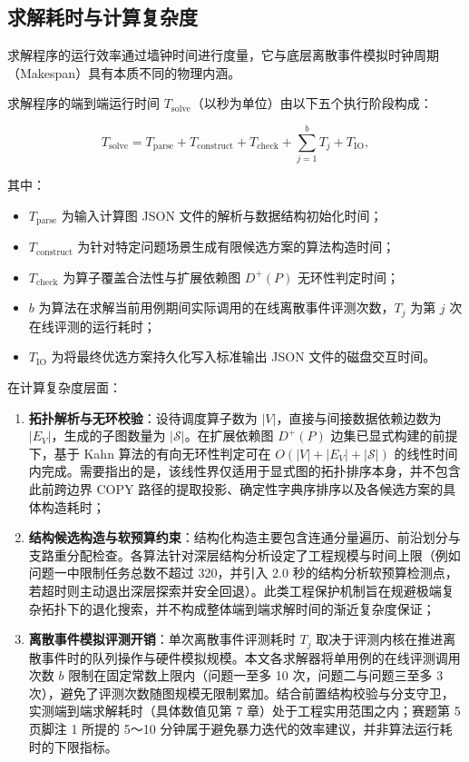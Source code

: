 \documentclass[anonymous,withtoc]{gmcm2026}
\providecommand{\tightlist}{\setlength{\itemsep}{0pt}\setlength{\parskip}{0pt}}
\begin{document}
\subsection{求解耗时与计算复杂度}

求解程序的运行效率通过墙钟时间进行度量，它与底层离散事件模拟时钟周期（Makespan）具有本质不同的物理内涵。

求解程序的端到端运行时间 \(T_{\mathrm{solve}}\)（以秒为单位）由以下五个执行阶段构成：

\begin{equation}
T_{\mathrm{solve}} = T_{\mathrm{parse}} + T_{\mathrm{construct}} + T_{\mathrm{check}} + \sum_{j=1}^{b} T_j + T_{\mathrm{IO}},
\end{equation}

其中：

\begin{itemize}
\tightlist
\item
  \(T_{\mathrm{parse}}\) 为输入计算图 JSON 文件的解析与数据结构初始化时间；
\item
  \(T_{\mathrm{construct}}\) 为针对特定问题场景生成有限候选方案的算法构造时间；
\item
  \(T_{\mathrm{check}}\) 为算子覆盖合法性与扩展依赖图 \(D^+(P)\) 无环性判定时间；
\item
  \(b\) 为算法在求解当前用例期间实际调用的在线离散事件评测次数，\(T_j\) 为第 \(j\) 次在线评测的运行耗时；
\item
  \(T_{\mathrm{IO}}\) 为将最终优选方案持久化写入标准输出 JSON 文件的磁盘交互时间。
\end{itemize}

在计算复杂度层面：

\begin{enumerate}
\def\labelenumi{\arabic{enumi}.}
\tightlist
\item
  \textbf{拓扑解析与无环校验}：设待调度算子数为 \(|V|\)，直接与间接数据依赖边数为 \(|E_V|\)，生成的子图数量为 \(|\mathcal{S}|\)。在扩展依赖图 \(D^+(P)\) 边集已显式构建的前提下，基于 Kahn 算法\cite{ref19}的有向无环性判定可在 \(O(|V| + |E_V| + |\mathcal{S}|)\) 的线性时间内完成。需要指出的是，该线性界仅适用于显式图的拓扑排序本身，并不包含此前跨边界 COPY 路径的提取投影、确定性字典序排序以及各候选方案的具体构造耗时；
\item
  \textbf{结构候选构造与软预算约束}：结构化构造主要包含连通分量遍历、前沿划分与支路重分配检查。各算法针对深层结构分析设定了工程规模与时间上限（例如问题一中限制任务总数不超过 320，并引入 2.0 秒的结构分析软预算检测点，若超时则主动退出深层探索并安全回退）。此类工程保护机制旨在规避极端复杂拓扑下的退化搜索，并不构成整体端到端求解时间的渐近复杂度保证；
\item
  \textbf{离散事件模拟评测开销}：单次离散事件评测耗时 \(T_j\) 取决于评测内核在推进离散事件时的队列操作与硬件模拟规模。本文各求解器将单用例的在线评测调用次数 \(b\) 限制在固定常数上限内（问题一至多 10 次，问题二与问题三至多 3 次），避免了评测次数随图规模无限制累加。结合前置结构校验与分支守卫，实测端到端求解耗时（具体数值见第 7 章）处于工程实用范围之内；赛题第 5 页脚注 1 所提的 5～10 分钟属于避免暴力迭代的效率建议，并非算法运行耗时的下限指标。
\end{enumerate}
\end{document}

